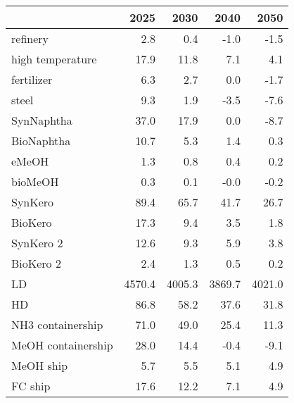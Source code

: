 \begin{tabular}{lrrrr}
\toprule
 & 2025 & 2030 & 2040 & 2050 \\
\midrule
refinery & 2.8 & 0.4 & -1.0 & -1.5 \\
high temperature & 17.9 & 11.8 & 7.1 & 4.1 \\
fertilizer & 6.3 & 2.7 & 0.0 & -1.7 \\
steel & 9.3 & 1.9 & -3.5 & -7.6 \\
SynNaphtha & 37.0 & 17.9 & 0.0 & -8.7 \\
BioNaphtha & 10.7 & 5.3 & 1.4 & 0.3 \\
eMeOH & 1.3 & 0.8 & 0.4 & 0.2 \\
bioMeOH & 0.3 & 0.1 & -0.0 & -0.2 \\
SynKero & 89.4 & 65.7 & 41.7 & 26.7 \\
BioKero & 17.3 & 9.4 & 3.5 & 1.8 \\
SynKero 2 & 12.6 & 9.3 & 5.9 & 3.8 \\
BioKero 2 & 2.4 & 1.3 & 0.5 & 0.2 \\
LD & 4570.4 & 4005.3 & 3869.7 & 4021.0 \\
HD & 86.8 & 58.2 & 37.6 & 31.8 \\
NH3 containership & 71.0 & 49.0 & 25.4 & 11.3 \\
MeOH containership & 28.0 & 14.4 & -0.4 & -9.1 \\
MeOH ship & 5.7 & 5.5 & 5.1 & 4.9 \\
FC ship & 17.6 & 12.2 & 7.1 & 4.9 \\
\bottomrule
\end{tabular}
